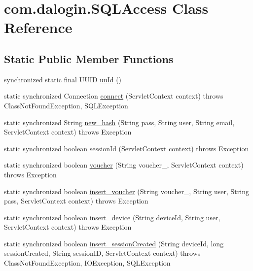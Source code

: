 \hypertarget{classcom_1_1dalogin_1_1_s_q_l_access}{}\section{com.\+dalogin.\+S\+Q\+L\+Access Class Reference}
\label{classcom_1_1dalogin_1_1_s_q_l_access}
\subsection*{Static Public Member Functions}
\begin{DoxyCompactItemize}
\item 
synchronized static final U\+U\+ID \hyperlink{classcom_1_1dalogin_1_1_s_q_l_access_aacb151b38bdb068523f10a75a2069149}{uu\+Id} ()
\item 
static synchronized Connection \hyperlink{classcom_1_1dalogin_1_1_s_q_l_access_aaf49ea97dbc3ae15a9db020070c6c915}{connect} (Servlet\+Context context)  throws Class\+Not\+Found\+Exception, S\+Q\+L\+Exception
\item 
static synchronized String \hyperlink{classcom_1_1dalogin_1_1_s_q_l_access_ac1bccabf13fc7e4268eb1a169aec2aac}{new\+\_\+hash} (String pass, String user, String email, Servlet\+Context context)  throws Exception 
\item 
static synchronized boolean \hyperlink{classcom_1_1dalogin_1_1_s_q_l_access_ade5ec7d23b3cc42804c39af135eb1551}{session\+Id} (Servlet\+Context context)  throws Exception 
\item 
static synchronized boolean \hyperlink{classcom_1_1dalogin_1_1_s_q_l_access_ace6682e8e095aa1d589a181c3ec37cb0}{voucher} (String voucher\+\_\+, Servlet\+Context context)  throws Exception 
\item 
static synchronized boolean \hyperlink{classcom_1_1dalogin_1_1_s_q_l_access_aea1ff7f91ae3168de8d06a78e9500cec}{insert\+\_\+voucher} (String voucher\+\_\+, String user, String pass, Servlet\+Context context)  throws Exception 
\item 
static synchronized boolean \hyperlink{classcom_1_1dalogin_1_1_s_q_l_access_a45cc8de9b6d3bfbd1ad9142c285fd6c4}{insert\+\_\+device} (String device\+Id, String user, Servlet\+Context context)  throws Exception 
\item 
static synchronized boolean \hyperlink{classcom_1_1dalogin_1_1_s_q_l_access_afbe8ec045fac97fdc76c62648c9bb648}{insert\+\_\+session\+Created} (String device\+Id, long session\+Created, String session\+ID, Servlet\+Context context)  throws Class\+Not\+Found\+Exception, I\+O\+Exception, S\+Q\+L\+Exception 

\end{DoxyCompactItemize}
